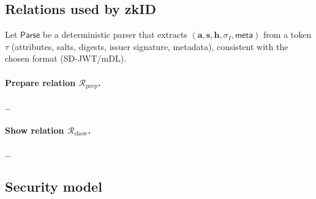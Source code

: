 \subsection{Relations used by \textsf{zkID}}
\label{subsec:relations}
Let $\mathsf{Parse}$ be a deterministic parser that extracts $(\mathbf{a},\mathbf{s},\mathbf{h},\sigma_I,\mathsf{meta})$ from a token $\tau$ (attributes, salts, digests, issuer signature, metadata), consistent with the chosen format (SD\mbox{-}JWT/mDL).

\paragraph{Prepare relation $\mathcal{R}_{\mathrm{prep}}$.}
\dots
\paragraph{Show relation $\mathcal{R}_{\mathrm{show}}$.}
\dots

\subsection{Security model}
\label{subsec:security-model}
